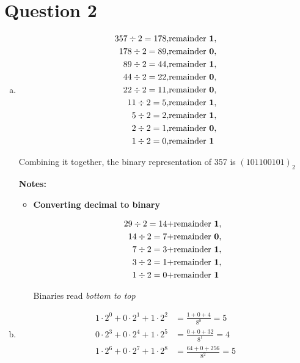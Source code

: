 \documentclass[12pt]{article}
\begin{document}
\section*{Question 2}
\begin{enumerate}[a.]
    \item
    \setcounter{equation}{0}
    \begin{align*}
        357 \div 2 = 178, &\text{remainder \textbf{1}},\\
        178 \div 2 = 89, &\text{remainder \textbf{0}},\\
        89 \div 2 = 44, &\text{remainder \textbf{1}},\\
        44 \div 2 = 22, &\text{remainder \textbf{0}},\\
        22 \div 2 = 11, &\text{remainder \textbf{0}},\\
        11 \div 2 = 5, &\text{remainder \textbf{1}},\\
        5 \div 2 = 2, &\text{remainder \textbf{1}},\\
        2 \div 2 = 1, &\text{remainder \textbf{0}},\\
        1 \div 2 = 0, &\text{remainder \textbf{1}}
    \end{align*}

    Combining it together, the binary representation of 357 is $(101100101)_2$

    \bigskip

    \textbf{Notes:}
    \begin{itemize}
        \item \textbf{Converting decimal to binary}

        \begin{align}
            29 \div 2 = 14 + &\text{remainder \textbf{1}},\\
            14 \div 2 = 7 + &\text{remainder \textbf{0}},\\
            7 \div 2 = 3 + &\text{remainder \textbf{1}},\\
            3 \div 2 = 1 + &\text{remainder \textbf{1}},\\
            1 \div 2 = 0 + &\text{remainder \textbf{1}}
        \end{align}

        Binaries read \textit{bottom to top}
    \end{itemize}

    \item

    \begin{align*}
        1 \cdot 2^0 + 0 \cdot 2^1 + 1 \cdot 2^2 &= \frac{1 + 0 + 4}{8^0} = 5\\
        0 \cdot 2^3 + 0 \cdot 2^4 + 1 \cdot 2^5 &= \frac{0 + 0 + 32}{8^1} = 4\\
        1 \cdot 2^6 + 0 \cdot 2^7 + 1 \cdot 2^8 &= \frac{64 + 0 + 256}{8^2} = 5
    \end{align*}


\end{enumerate}
\end{document}
